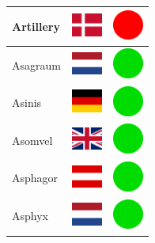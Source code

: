 \documentclass[12pt, a4paper, twoside]{report}
\begin{document}
\begin{center}
\begin{longtable}{|p{5cm}|p{2cm}|p{2cm}|}
Artillery & \includegraphics[width=1cm]{4x3/dk} & \includegraphics[width=1cm]{likes/n} \\ \hline
Asagraum & \includegraphics[width=1cm]{4x3/nl} & \includegraphics[width=1cm]{likes/y} \\ \hline
Asinis & \includegraphics[width=1cm]{4x3/de} & \includegraphics[width=1cm]{likes/y} \\ \hline
Asomvel & \includegraphics[width=1cm]{4x3/gb} & \includegraphics[width=1cm]{likes/y} \\ \hline
Asphagor & \includegraphics[width=1cm]{4x3/at} & \includegraphics[width=1cm]{likes/y} \\ \hline
Asphyx & \includegraphics[width=1cm]{4x3/nl} & \includegraphics[width=1cm]{likes/y} \\ \hline

\end{longtable}
\end{center}
\end{document}
